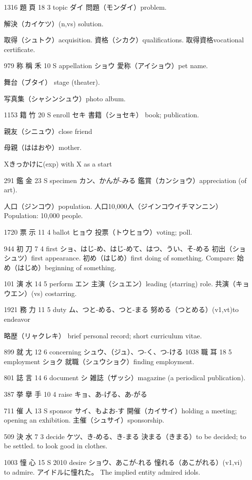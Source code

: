 1316	題		頁	18	3		topic	ダイ
問題（モンダイ）problem.

解決（カイケツ）(n,vs) solution.

取得（シュトク）acquisition.
資格（シカク）qualifications.
取得資格vocational certificate.

979	称	稱	禾	10	S		appellation	ショウ
愛称（アイショウ）pet name.

舞台（ブタイ）
stage (theater).

写真集（シャシンシュウ）photo album.

1153	籍		竹	20	S		enroll	セキ
書籍（ショセキ）
book; publication.

親友（シニュウ）close friend

母親（ははおや）mother.

Xきっかけに(exp) with X as a start

291	鑑		金	23	S		specimen	カン、かんが-みる
鑑賞（カンショウ）appreciation (of art).

人口（ジンコウ）population.
人口10,000人（ジインコウイチマンニン）
Population: 10,000 people.

1720	票		示	11	4		ballot	ヒョウ
投票（トウヒョウ）voting; poll.

944	初		刀	7	4		first	ショ、はじ-め、はじ-めて、はつ、うい、そ-める
初出（ショシュツ）first appearance.
初め（はじめ）first doing of something.
Compare: 始め（はじめ）beginning of something.

101	演		水	14	5		perform	エン
主演（シュエン）leading (starring) role.
共演（キョウエン）(vs) costarring.

1921	務		力	11	5		duty	ム、つと-める、つと-まる
努める（つとめる）(v1,vt)to endeavor

略歴（リャクレキ）
brief personal record;
short curriculum vitae.

899	就		尢	12	6		concerning	シュウ、（ジュ）、つ-く、つ-ける
1038	職		耳	18	5		employment	ショク
就職（シュウショク）finding employment.

801	誌		言	14	6		document	シ
雑誌（ザッシ）magazine (a periodical publication).

387	挙	擧	手	10	4		raise	キョ、あ-げる、あ-がる

711	催		人	13	S		sponsor	サイ、もよお-す
開催（カイサイ）holding a meeting; opening an exhibition.
主催（シュサイ）sponsorship.

509	決		水	7	3		decide	ケツ、き-める、き-まる
決まる（きまる）to be decided; to be settled. to look good in clothes.

1003	憧		心	15	S	2010	desire	ショウ、あこが-れる
憧れる（あこがれる）(v1,vi) to admire.
アイドルに憧れた。
The implied entity admired idols.

